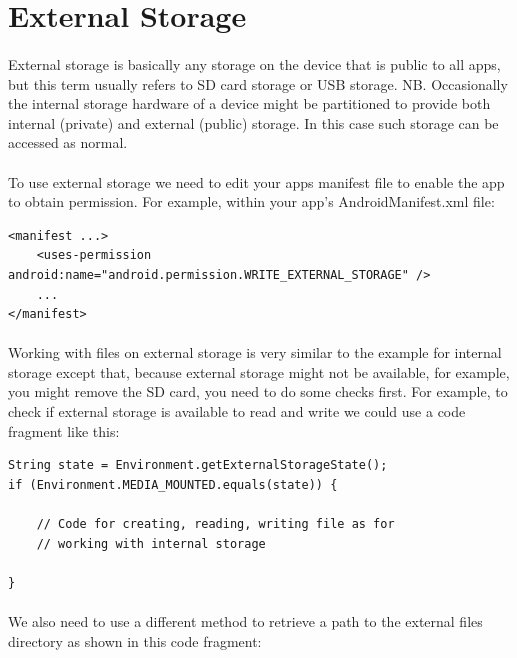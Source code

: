 \documentclass[12pt, a4paper, twoside]{book}
\begin{document}
\section{External Storage}
\paragraph{} External storage is basically any storage on the device that is public to all apps, but this term usually refers to SD card storage or USB storage. NB. Occasionally the internal storage hardware of a device might be partitioned to provide both internal (private) and external (public) storage. In this case such storage can be accessed as normal.

\paragraph{} To use external storage we need to edit your apps manifest file to enable the app to obtain permission. For example, within your app's AndroidManifest.xml file:

\begin{lstlisting}
<manifest ...>
    <uses-permission android:name="android.permission.WRITE_EXTERNAL_STORAGE" />
    ...
</manifest>
\end{lstlisting}

\paragraph{} Working with files on external storage is very similar to the example for internal storage except that, because external storage might not be available, for example, you might remove the SD card, you need to do some checks first. For example, to check if external storage is available to read and write we could use a code fragment like this:

\begin{lstlisting}
String state = Environment.getExternalStorageState();
if (Environment.MEDIA_MOUNTED.equals(state)) {
    
    // Code for creating, reading, writing file as for
    // working with internal storage

}
\end{lstlisting}

\paragraph{} We also need to use a different method to retrieve a path to the external files directory as shown in this code fragment:
\end{document}
